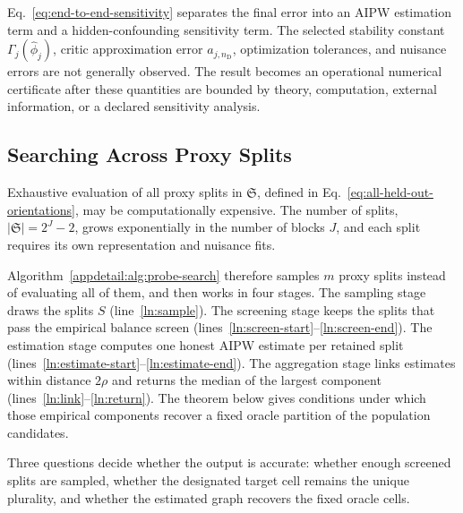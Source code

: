 Eq.~\eqref{eq:end-to-end-sensitivity} separates the final error into an AIPW estimation term and a hidden-confounding sensitivity term. The selected stability constant $\Gamma_j(\widehat\phi_j)$, critic approximation error $a_{j,n_{\mathrm D}}$, optimization tolerances, and nuisance errors are not generally observed. The result becomes an operational numerical certificate after these quantities are bounded by theory, computation, external information, or a declared sensitivity analysis.

\subsection{Searching Across Proxy Splits}
\label{sec:random-orientation-search}
Exhaustive evaluation of all proxy splits in $\mathfrak S$, defined in Eq.~\eqref{eq:all-held-out-orientations}, may be computationally expensive. The number of splits, $|\mathfrak S|=2^J-2$, grows exponentially in the number of blocks $J$, and each split requires its own representation and nuisance fits.

 Algorithm~\ref{appdetail:alg:probe-search} therefore samples $m$ proxy splits instead of evaluating all of them, and then works in four stages. The sampling stage draws the splits $S$ (line~\ref{ln:sample}). The screening stage keeps the splits that pass the empirical balance screen (lines~\ref{ln:screen-start}--\ref{ln:screen-end}). The estimation stage computes one honest AIPW estimate per retained split (lines~\ref{ln:estimate-start}--\ref{ln:estimate-end}). The aggregation stage links estimates within distance $2\rho$ and returns the median of the largest component (lines~\ref{ln:link}--\ref{ln:return}). The theorem below gives conditions under which those empirical components recover a fixed oracle partition of the population candidates.

 Three questions decide whether the output is accurate: whether enough screened splits are sampled, whether the designated target cell remains the unique plurality, and whether the estimated graph recovers the fixed oracle cells.

